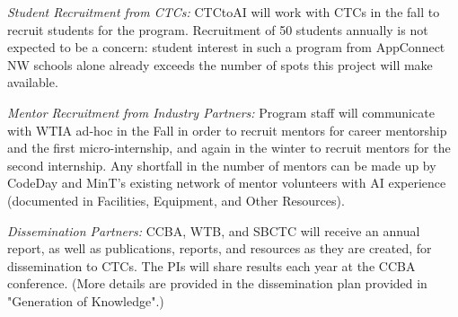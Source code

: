 \textit{Student Recruitment from CTCs:} CTCtoAI will work with CTCs in the fall to recruit students for the program. Recruitment of 50 students annually is not expected to be a concern: student interest in such a program from AppConnect NW schools alone already exceeds the number of spots this project will make available.

\textit{Mentor Recruitment from Industry Partners:} Program staff will communicate with WTIA ad-hoc in the Fall in order to recruit mentors for career mentorship and the first micro-internship, and again in the winter to recruit mentors for the second internship. Any shortfall in the number of mentors can be made up by CodeDay and MinT's existing network of mentor volunteers with AI experience (documented in Facilities, Equipment, and Other Resources).

\textit{Dissemination Partners:} CCBA, WTB, and SBCTC will receive an annual report, as well as publications, reports, and resources as they are created, for dissemination to CTCs. The PIs will share results each year at the CCBA conference. (More details are provided in the dissemination plan provided in "Generation of Knowledge".)